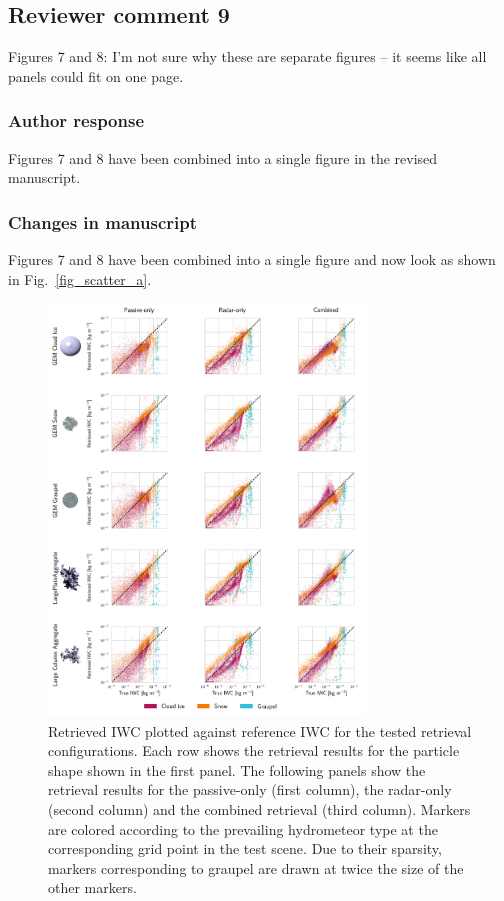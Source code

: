 \subsection*{Reviewer comment 9}

Figures 7 and 8:  I’m not sure why these are separate figures – it seems like all panels could fit on one page.

\subsubsection*{Author response}

Figures 7 and 8 have been combined into a single figure in the revised
manuscript.


\subsubsection*{Changes in manuscript}

Figures 7 and 8 have been combined into a single figure and now look as shown in
Fig.~\ref{fig_scatter_a}.

\begin{figure}
\centering \includegraphics[width = 0.75\textwidth]{../plots/results_scatter_a}
\caption{Retrieved IWC plotted against reference IWC for the tested retrieval
  configurations. Each row shows the retrieval results for the particle shape
  shown in the first panel. The following panels show the retrieval results for
  the passive-only (first column), the radar-only (second column) and the
  combined retrieval (third column). Markers are colored according to the
  prevailing hydrometeor type at the corresponding grid point in the test
  scene. Due to their sparsity, markers corresponding to graupel are drawn at
  twice the size of the other markers.}
\label{fig:results_scatter_a}
\end{figure}

